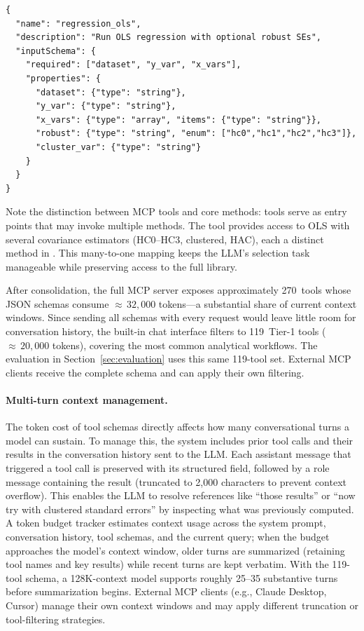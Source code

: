 \begin{verbatim}
{
  "name": "regression_ols",
  "description": "Run OLS regression with optional robust SEs",
  "inputSchema": {
    "required": ["dataset", "y_var", "x_vars"],
    "properties": {
      "dataset": {"type": "string"},
      "y_var": {"type": "string"},
      "x_vars": {"type": "array", "items": {"type": "string"}},
      "robust": {"type": "string", "enum": ["hc0","hc1","hc2","hc3"]},
      "cluster_var": {"type": "string"}
    }
  }
}
\end{verbatim}

\noindent Note the distinction between MCP tools and core methods:
tools serve as entry points that may invoke multiple methods. The
 tool provides access to OLS with several
covariance estimators (HC0--HC3, clustered, HAC), each a distinct
method in . This many-to-one mapping keeps the LLM's
selection task manageable while preserving access to the full library.

After consolidation, the full MCP server exposes approximately
270~tools whose JSON schemas consume ${\approx}\,32{,}000$
tokens---a substantial share of current context windows.  Since
sending all schemas with every request would leave little room for
conversation history, the built-in chat interface filters to
119~Tier-1 tools (${\approx}\,20{,}000$ tokens), covering
the most common analytical workflows.  The evaluation in
Section~\ref{sec:evaluation} uses this same 119-tool set.
External MCP clients receive the complete schema and can apply
their own filtering.

\paragraph{Multi-turn context management.}
The token cost of tool schemas directly affects how many
conversational turns a model can sustain.  To manage this, the system
includes prior tool calls and their results in the conversation
history sent to the LLM.  Each assistant message that triggered a tool
call is preserved with its structured  field,
followed by a  role message containing the result
(truncated to 2{,}000 characters to prevent context overflow). This
enables the LLM to resolve references like ``those results'' or ``now
try with clustered standard errors'' by inspecting what was previously
computed.  A token budget tracker estimates context usage across the
system prompt, conversation history, tool schemas, and the current
query; when the budget approaches the model's context window, older
turns are summarized (retaining tool names and key results) while
recent turns are kept verbatim.  With the 119-tool schema, a
128K-context model supports roughly 25--35 substantive turns before
summarization begins.  External MCP clients (e.g., Claude Desktop,
Cursor) manage their own context windows and may apply different
truncation or tool-filtering strategies.

